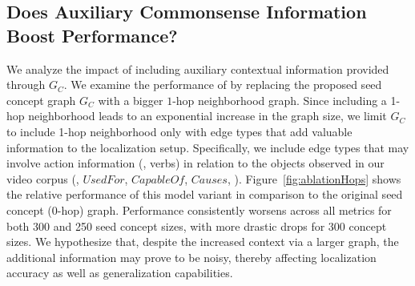 \subsection{Does Auxiliary Commonsense Information Boost Performance?}
\label{ablation:hops}

We analyze the impact of including auxiliary contextual information provided through \(G_{C}\). We examine the performance of \modelname by replacing the proposed seed concept graph \(G_{C}\) with a bigger $1$-hop neighborhood graph. Since including a 1-hop neighborhood leads to an exponential increase in the graph size, we limit $G_C$ to include 1-hop neighborhood only with edge types that add valuable information to the localization setup. Specifically, we include edge types that may involve action information (\ie, verbs) in relation to the objects observed in our video corpus (\eg, $UsedFor$, $CapableOf$, $Causes$, \etc). 
Figure~\ref{fig:ablationHops}
shows the relative performance of this model variant in comparison to the original seed concept (0-hop) graph. Performance consistently worsens across all metrics for both 300 and 250 seed concept sizes, with more drastic drops for 300 concept sizes. We hypothesize that, despite the increased context via a larger graph, the additional information may prove to be noisy, thereby affecting localization accuracy as well as generalization capabilities.